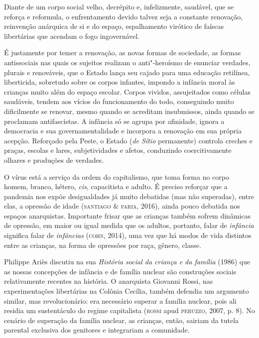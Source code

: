 Diante de um corpo social velho, decrépito e, infelizmente, saudável,
que se reforça e reformula, o enfrentamento devido talvez seja a
constante renovação, reinvenção anárquica de si e do espaço,
espalhamento virótico de faíscas libertárias que acendam o fogo
ingovernável.

É justamente por temer a renovação, as novas formas de sociedade, as
formas antissociais nas quais os sujeitos realizam o anti"-heroísmo de
enunciar verdades, plurais e renováveis, que o Estado lança seu cajado
para uma educação retilínea, liberticida, sobretudo sobre os corpos
infantes, impondo a infância moral às crianças muito além do espaço
escolar. Corpos vividos, assujeitados como células saudáveis, tendem aos
vícios do funcionamento do todo, conseguindo muito dificilmente se
renovar, mesmo quando se acreditam insubmissos, ainda quando se
proclamam antifascistas. A infância só se agrupa por afinidade, ignora a
democracia e sua governamentalidade e incorpora a renovação em sua
própria acepção. Reforçado pela Peste, o Estado (\emph{de Sítio}
permanente) controla creches e praças, escolas e lares, subjetividades e
afetos, conduzindo coercitivamente olhares e produções de verdades.

O vírus está a serviço da ordem do capitalismo, que toma forma no corpo
homem, branco, hétero, \emph{cis}, capacitista e adulto. É preciso
reforçar que a pandemia nos expõe desigualdades já muito debatidas (mas
não superadas), entre elas, a opressão de idade (\textsc{santiago} \& \textsc{faria},
2016), ainda pouco debatida nos espaços anarquistas. Importante frisar
que as crianças também sofrem dinâmicas de opressão, em maior ou igual
medida que os adultos, portanto, falar de \emph{infância} significa
falar de \emph{infâncias} (\textsc{cohn}, 2014), uma vez que há modos de vida
distintos entre as crianças, na forma de opressões por raça, gênero,
classe.

Philippe Ariès discutiu na sua \emph{História social da criança e da
família} (1986) que as nossas concepções de infância e de família
nuclear são construções sociais relativamente recentes na história. O
anarquista Giovanni Rossi, nas experimentações libertárias na Colônia
Cecília, também defendia um argumento similar, mas revolucionário: era
necessário superar a família nuclear, pois ali residia um sustentáculo
do regime capitalista (\textsc{rossi} apud \textsc{peruzzo}, 2007, p. 8). No cenário de
superação da família nuclear, as crianças, então, sairiam da tutela
parental exclusiva dos genitores e integrariam a comunidade.

